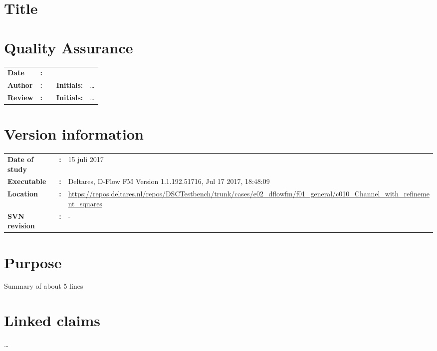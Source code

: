 \section{Title}
\newrefsegment

\section*{Quality Assurance}
\begin{tabular}{@{}p{27mm}@{}p{0mm}p{\textwidth-52mm-48pt}p{15mm}p{10mm}}
\textbf{Date} & \textbf{:} &   \\
\textbf{Author} & \textbf{:} &   & \textbf{Initials:} & \ldots \\
\textbf{Review} & \textbf{:} &   & \textbf{Initials:} & \ldots
\end{tabular}

\section*{Version information}
\begin{tabular}{@{}p{23mm}@{}p{0mm}p{\textwidth-23mm-30pt}}
\textbf{Date of study}& \textbf{:} & 15 juli 2017 \\
\textbf{Executable}   & \textbf{:} & Deltares, D-Flow FM Version 1.1.192.51716, Jul 17 2017, 18:48:09 \\
\textbf{Location}     & \textbf{:} & \url{https://repos.deltares.nl/repos/DSCTestbench/trunk/cases/e02_dflowfm/f01_general/c010_Channel_with_refinement_squares} \\
\textbf{SVN revision} & \textbf{:} & -
\end{tabular}

\section*{Purpose}
Summary of about 5 lines

\section*{Linked claims}
\ldots

